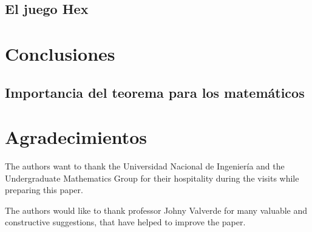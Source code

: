 \documentclass[3p,times,a4paper,twocolumn,authoryear]{elsarticle} %
\begin{document}
\subsection{El juego Hex}

\section{Conclusiones}

\subsection{Importancia del teorema para los matemáticos}

\section*{Agradecimientos}

The authors want to thank the Universidad Nacional de Ingeniería and the Undergraduate Mathematics Group for their hospitality during the visits while preparing this paper.

The authors would like to thank professor Johny Valverde for many valuable and constructive suggestions, that have helped to improve the paper.

\nocite{*}
\printbibliography[title={Referencias}]
\end{document}
